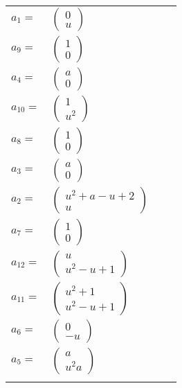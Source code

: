 \documentclass[1p]{elsarticle_modified}
\theoremstyle{definition}
\begin{document}
\begin{tabular}{m{7pt} m{180pt} m{7pt} m{180pt} }
\flushright $a_{1}=$&$\begin{pmatrix}0\\u\end{pmatrix}$ \\
\flushright $a_{9}=$&$\begin{pmatrix}1\\0\end{pmatrix}$ \\
\flushright $a_{4}=$&$\begin{pmatrix}a\\0\end{pmatrix}$ \\
\flushright $a_{10}=$&$\begin{pmatrix}1\\u^2\end{pmatrix}$ \\
\flushright $a_{8}=$&$\begin{pmatrix}1\\0\end{pmatrix}$ \\
\flushright $a_{3}=$&$\begin{pmatrix}a\\0\end{pmatrix}$ \\
\flushright $a_{2}=$&$\begin{pmatrix}u^2+a- u+2\\u\end{pmatrix}$ \\
\flushright $a_{7}=$&$\begin{pmatrix}1\\0\end{pmatrix}$ \\
\flushright $a_{12}=$&$\begin{pmatrix}u\\u^2- u+1\end{pmatrix}$ \\
\flushright $a_{11}=$&$\begin{pmatrix}u^2+1\\u^2- u+1\end{pmatrix}$ \\
\flushright $a_{6}=$&$\begin{pmatrix}0\\- u\end{pmatrix}$ \\
\flushright $a_{5}=$&$\begin{pmatrix}a\\u^2 a\end{pmatrix}$\\&\end{tabular}
\end{document}
